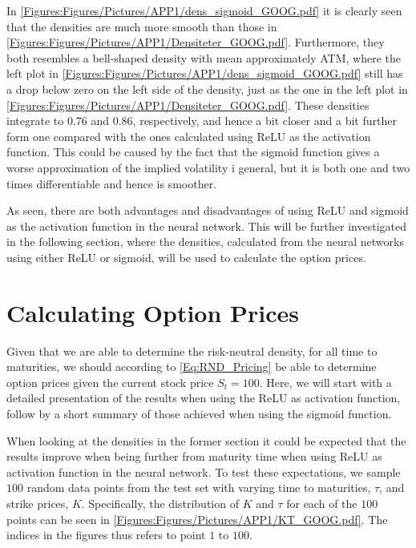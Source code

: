 In \autoref{Figures:Figures/Pictures/APP1/dens_sigmoid_GOOG.pdf} it is clearly seen that the densities are much more smooth than those in \autoref{Figures:Figures/Pictures/APP1/Densiteter_GOOG.pdf}. Furthermore, they both resembles a bell-shaped density with mean approximately ATM, where the left plot in \autoref{Figures:Figures/Pictures/APP1/dens_sigmoid_GOOG.pdf} still has a drop below zero on the left side of the density, just as the one in the left plot in  \autoref{Figures:Figures/Pictures/APP1/Densiteter_GOOG.pdf}. These densities integrate to $0.76$ and $0.86$, respectively, and hence a bit closer and a bit further form one compared with the ones calculated using ReLU as the activation function. This could be caused by the fact that the sigmoid function gives a worse approximation of the implied volatility i general, but it is both one and two times differentiable and hence is smoother. 

As seen, there are both advantages and disadvantages of using ReLU and sigmoid as the activation function in the neural network. This will be further investigated in the following section, where the densities, calculated from the neural networks using either ReLU or sigmoid, will be used to calculate the option prices.  


\section{Calculating Option Prices}\label{Sec.App:Calculating_Option_Prices}
Given that we are able to determine the risk-neutral density, for all time to maturities, we should according to \eqref{Eq:RND_Pricing} be able to determine option prices given the current stock price $S_t=100$. Here, we will start with a detailed presentation of the results when using the ReLU as activation function, follow by a short summary of those achieved when using the sigmoid function. 

When looking at the densities in the former section it could be expected that the results improve when being further from maturity time when using ReLU as activation function in the neural network. To test these expectations, we sample $100$ random data points from the test set with varying time to maturities, $\tau$, and strike prices, $K$. Specifically, the distribution of $K$ and $\tau$ for each of the $100$ points can be seen in \autoref{Figures:Figures/Pictures/APP1/KT_GOOG.pdf}. The indices in the figures thus refers to point $1$ to $100$.


